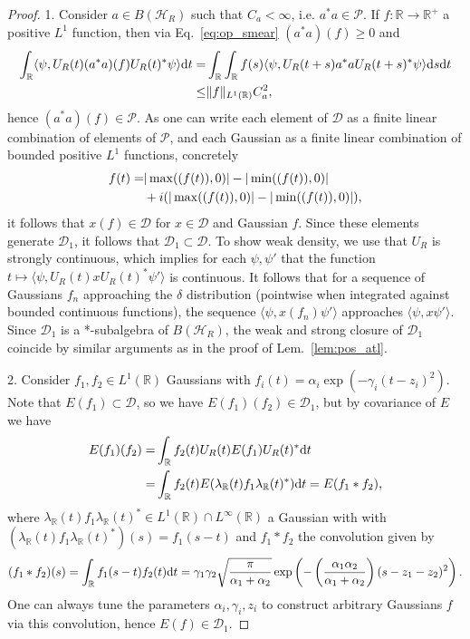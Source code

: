 \documentclass[sn-mathphys-num]{sn-jnl}%
\let\Im\relax
\DeclareMathOperator{\Im}{Im}
\let\Re\relax
\DeclareMathOperator{\Re}{Re}
\newcommand{\RR}{\mathbb{R}}
\newcommand{\HH}{\mathcal{H}}
\newcommand{\diff}{\textup{d}}
\numberwithin{equation}{section}
\theoremstyle{thmstyleone}%
\theoremstyle{thmstyletwo}%
\theoremstyle{thmstylethree}%
\begin{document}
\begin{proof}
    1. Consider $a\in B(\HH_R)$ such that $C_a<\infty$, i.e. $a^*a\in\mathcal{P}$. If $f:\RR\to\RR^+$ a positive $L^1$ function, then via Eq.~\eqref{eq:op_smear} $(a^*a)(f)\geq 0$ and
        \begin{align}
            \int_\RR\langle \psi,U_R(t)(a^*a)(f)U_R(t)^*\psi\rangle\diff t=&\int_\RR \int_\RR  f(s) \langle\psi,U_R(t+s)a^*aU_R(t+s)^*\psi\rangle\diff s\diff t\\
            \leq&\Vert f\Vert_{L^1(\RR)}C_a^2,
        \end{align}
    hence $(a^*a)(f)\in\mathcal{P}$. As one can write each element of $\mathcal{D}$ as a finite linear combination of elements of $\mathcal{P}$, and each Gaussian as a finite linear combination of bounded positive $L^1$ functions, concretely 
    \begin{align}
        f(t)=&\vert\max(\Re(f(t)),0)\vert-\vert\min(\Re(f(t)),0)\vert\nonumber\\
        &+i(\vert\max(\Im(f(t)),0)\vert-\vert\min(\Im(f(t)),0)\vert),
    \end{align} it follows that $x(f)\in\mathcal{D}$ for $x\in\mathcal{D}$ and Gaussian $f$. Since these elements generate $\mathcal{D}_1$, it follows that $\mathcal{D}_1\subset\mathcal{D}$. To show weak density, we use that $U_R$ is strongly continuous, which implies for each $\psi,\psi'$ that the function $t\mapsto\langle \psi,U_R(t)xU_R(t)^*\psi'\rangle$ is continuous. It follows that for a sequence of Gaussians $f_n$ approaching the $\delta$ distribution (pointwise when integrated against bounded continuous functions), the sequence $\langle\psi,x(f_n)\psi'\rangle$ approaches $\langle\psi,x\psi'\rangle$. Since $\mathcal{D}_1$ is a *-subalgebra of $B(\HH_R)$, the weak and strong closure of $\mathcal{D}_1$ coincide by similar arguments as in the proof of Lem.\ \ref{lem:pos_atl}.

    2. Consider $f_1,f_2\in L^1(\RR)$ Gaussians with $f_i(t)=\alpha_i\exp(-\gamma_i(t-z_i)^2)$. Note that $E(f_1)\subset\mathcal{D}$, so we have $E(f_1)(f_2)\in\mathcal{D}_1$, but by covariance of $E$ we have
    \begin{align}
        E(f_1)(f_2)=&\int_\RR f_2(t)U_R(t)E(f_1)U_R(t)^*\diff t\nonumber\\
        =&\int_\RR f_2(t)E(\lambda_\RR(t)f_1\lambda_\RR(t)^*)\diff t=E(f_1*f_2),
    \end{align}
    where $\lambda_\RR(t)f_1\lambda_\RR(t)^*\in L^1(\RR)\cap L^\infty(\RR)$ a Gaussian with with $(\lambda_\RR(t)f_1\lambda_\RR(t)^*)(s)=f_1(s-t)$ and $f_1*f_2$ the convolution given by
    \begin{equation}
        (f_1*f_2)(s)=\int_\RR f_1(s-t)f_2(t)\diff t=\gamma_1\gamma_2\sqrt{\frac{\pi}{\alpha_1+\alpha_2}}\exp\left(-\left(\frac{\alpha_1\alpha_2}{\alpha_1+\alpha_2}\right)(s-z_1-z_2)^2\right).
    \end{equation}
    One can always tune the parameters $\alpha_i,\gamma_i,z_i$ to construct arbitrary Gaussians $f$ via this convolution, hence $E(f)\in\mathcal{D}_1$.


\end{proof}
\end{document}
